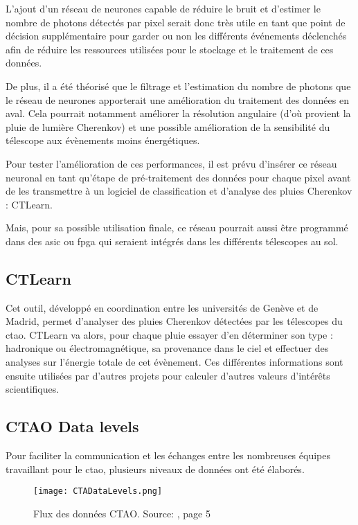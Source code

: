 L'ajout d'un réseau de neurones capable de réduire le bruit et d'estimer le nombre de photons détectés par pixel serait donc très utile en tant que 
point de décision supplémentaire pour garder ou non les différents événements déclenchés afin de réduire les ressources utilisées pour le stockage 
et le traitement de ces données.

De plus, il a été théorisé que le filtrage et l'estimation du nombre de photons que le réseau de neurones apporterait une amélioration du 
traitement des données en aval. Cela pourrait notamment améliorer la résolution angulaire (d'où provient la pluie de lumière Cherenkov) et une possible amélioration de
la sensibilité du télescope aux évènements moins énergétiques.

Pour tester l'amélioration de ces performances, il est prévu d'insérer ce réseau neuronal en tant qu'étape de pré-traitement des données
pour chaque pixel avant de les transmettre à un logiciel de classification et d'analyse des pluies Cherenkov : CTLearn.

Mais, pour sa possible utilisation finale, ce réseau pourrait aussi être programmé dans des \gls{asic} ou \gls{fpga} qui seraient intégrés dans les différents télescopes au sol.

\subsection{CTLearn}
Cet outil, développé en coordination entre les universités de Genève et de Madrid, permet d'analyser des pluies Cherenkov détectées 
par les télescopes du \gls{ctao}. CTLearn va alors, pour chaque pluie essayer d'en déterminer son type : hadronique ou électromagnétique, 
sa provenance dans le ciel et effectuer des analyses sur l'énergie totale de cet évènement.
Ces différentes informations sont ensuite utilisées par d'autres projets pour calculer d'autres valeurs d'intérêts scientifiques.

\subsection{CTAO Data levels}
Pour faciliter la communication et les échanges entre les nombreuses équipes travaillant pour le \gls{ctao}, 
plusieurs niveaux de données ont été élaborés.

\begin{figure}[tbph!]
	\centering
	\texttt{[image: CTADataLevels.png]}
	\caption[Flux des données CTAO]{Flux des données CTAO. Source: \cite{CTAOComputingChallenges}, page 5}
\end{figure}


